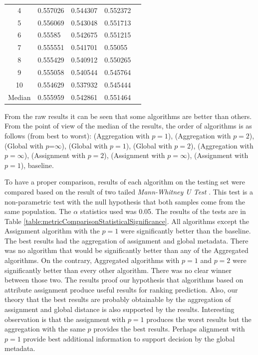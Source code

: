 \begin{table}[ht]
\begin{tabular}{cllll}
			4 &	0.557026 & 0.544307 & 0.552372 \\
			5 &	0.556069 & 0.543048 & 0.551713 \\
			6 &	0.55585 & 0.542675 & 0.551215 \\
			7 &	0.555551 & 0.541701 & 0.55055 \\
			8 &	0.555429 & 0.540912 & 0.550265 \\
			9 &	0.555058 & 0.540544 & 0.545764 \\
			10& 0.554629 & 0.537932 & 0.545444 \\
			Median &0.555959 & 0.542861 & 0.551464 \\
		\bottomrule
	\end{tabular}
\end{table}
From the raw results it can be seen that some algorithms are better than others. From the point of view of the median of the results, the order of algorithms is as follows (from best to worst): (Aggregation with $p=1$), (Aggregation with $p=2$), (Global with $p$=$\infty$), (Global with $p=1$), (Global with $p=2$), (Aggregation with $p=\infty$), (Assignment with $p=2$), (Assignment with $p=\infty$), (Assignment with $p=1$), baseline.
 
 To have a proper comparison, results of each algorithm on the testing set were compared based on the result of two tailed \emph{Mann-Whitney U Test} \cite{manWhitney}. This test is a non-parametric test with the null hypothesis that both samples come from the same population. The $\alpha$ statistics used was 0.05. The results of the tests are in Table \ref{table:metricComparisonStatisticalSignificance}. All algorithms except the Assignment algorithm with the $p=1$ were significantly better than the baseline. The best results had the aggregation of assignment and global metadata. There was no algorithm that would be significantly better than any of the Aggregated algorithms. On the contrary, Aggregated algorithms with $p=1$ and $p=2$ were significantly better than every other algorithm. There was no clear winner between those two. The results proof our hypothesis that algorithms based on attribute assignment produce useful results for ranking prediction. Also, our theory that the best results are probably obtainable by the aggregation of assignment and global distance is also supported by the results. Interesting observation is that the assignment with $p=1$ produces the worst results but the aggregation with the same $p$ provides the best results. Perhaps alignment with $p=1$ provide best additional information to support decision by the global metadata.
 
